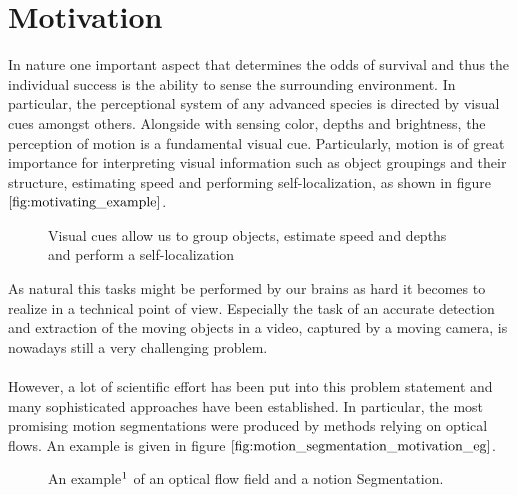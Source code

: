\section{Motivation}
In nature one important aspect that determines the odds of survival and thus the individual success is the ability to sense the surrounding environment. In particular, the perceptional system of any advanced species is directed by visual cues amongst others. Alongside with sensing color, depths and brightness, the perception of motion is a fundamental visual cue. Particularly, motion is of great importance for interpreting visual information such as object groupings and their structure, estimating speed and performing self-localization, as shown in figure $\ref{fig:motivating_example}$.
\begin{figure}[H]
\begin{center}
\end{center}
\caption[Motivating Example]{Visual cues allow us to group objects, estimate speed and depths and perform a self-localization}
\label{fig:motivating_example}
\end{figure}
As natural this tasks might be performed by our brains as hard it becomes to realize in a technical point of view. Especially the task of an accurate detection and extraction of the moving objects in a video, captured by a moving camera, is nowadays still a very challenging problem. \\ \\
However, a lot of scientific effort has been put into this problem statement and many sophisticated approaches have been established. In particular, the most promising motion segmentations were produced by methods relying on optical flows. An example is given in figure $\ref{fig:motion_segmentation_motivation_eg}$.
\begin{figure}[H]
\begin{center}
\end{center}
\caption[Motion Segmentation Motivation Example]{An example$\footnotemark$ of an optical flow field and a notion Segmentation. }
\label{fig:motion_segmentation_motivation_eg}
\end{figure}

